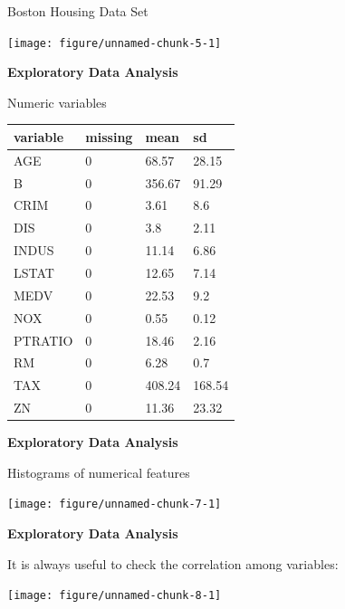 \documentclass[11pt,compress,t,notes=noshow, xcolor=table]{beamer}
\newenvironment{knitrout}{}{} %
\begin{document}
\begin{vbframe}{Boston Housing Data Set}
\begin{knitrout}
{\centering \texttt{[image: figure/unnamed-chunk-5-1]} 

}



\end{knitrout}

\framebreak

\textbf{Exploratory Data Analysis}


Numeric variables

\begin{table}[H]
\centering\begingroup\fontsize{6}{8}\selectfont

\begin{tabular}{llll}
\toprule
variable & missing & mean & sd\\
\midrule
AGE & 0 & 68.57 & 28.15\\
B & 0 & 356.67 & 91.29\\
CRIM & 0 & 3.61 & 8.6\\
DIS & 0 & 3.8 & 2.11\\
INDUS & 0 & 11.14 & 6.86\\
\addlinespace
LSTAT & 0 & 12.65 & 7.14\\
MEDV & 0 & 22.53 & 9.2\\
NOX & 0 & 0.55 & 0.12\\
PTRATIO & 0 & 18.46 & 2.16\\
RM & 0 & 6.28 & 0.7\\
\addlinespace
TAX & 0 & 408.24 & 168.54\\
ZN & 0 & 11.36 & 23.32\\
\bottomrule
\end{tabular}\endgroup{}
\end{table}



\framebreak

\textbf{Exploratory Data Analysis}


Histograms of numerical features

\begin{knitrout}\tiny
{}\color{fgcolor}

{\centering \texttt{[image: figure/unnamed-chunk-7-1]} 

}



\end{knitrout}


\framebreak

\textbf{Exploratory Data Analysis}


It is always useful to check the correlation among variables:

\begin{knitrout}\tiny
{}\color{fgcolor}

{\centering \texttt{[image: figure/unnamed-chunk-8-1]} 

}



\end{knitrout}

\end{vbframe}
\end{document}
